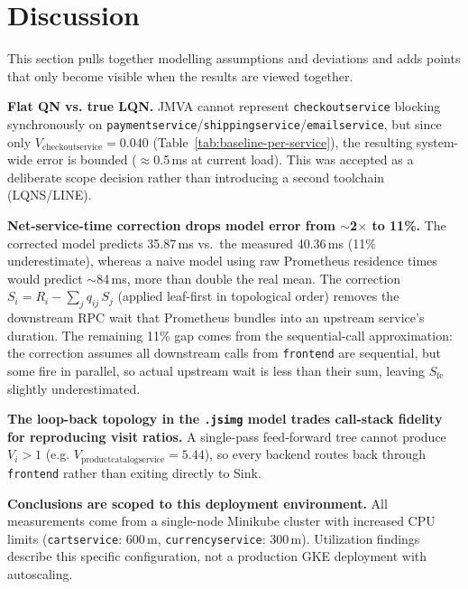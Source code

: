 \documentclass[12pt]{article}
\begin{document}
\section{Discussion}

This section pulls together modelling assumptions and deviations and adds points that only become visible when the results are viewed together.

\textbf{Flat QN vs. true LQN.} JMVA cannot represent \texttt{checkoutservice} blocking synchronously on \texttt{paymentservice}/\texttt{shippingservice}/\texttt{emailservice}, but since only $V_{\text{checkoutservice}}=0.040$ (Table~\ref{tab:baseline-per-service}), the resulting system-wide error is bounded ($\approx$0.5\,ms at current load). This was accepted as a deliberate scope decision rather than introducing a second toolchain (LQNS/LINE).

\textbf{Net-service-time correction drops model error from $\sim$2$\times$ to 11\%.} The corrected model predicts 35.87\,ms vs.\ the measured 40.36\,ms (11\% underestimate), whereas a naive model using raw Prometheus residence times would predict $\sim$84\,ms, more than double the real mean. The correction $S_i = R_i - \sum_j q_{ij}\,S_j$ (applied leaf-first in topological order) removes the downstream RPC wait that Prometheus bundles into an upstream service's duration. The remaining 11\% gap comes from the sequential-call approximation: the correction assumes all downstream calls from \texttt{frontend} are sequential, but some fire in parallel, so actual upstream wait is less than their sum, leaving $S_{\text{fe}}$ slightly underestimated.

\textbf{The loop-back topology in the \texttt{.jsimg} model trades call-stack fidelity for reproducing visit ratios.} A single-pass feed-forward tree cannot produce $V_i>1$ (e.g. $V_{\text{productcatalogservice}}=5.44$), so every backend routes back through \texttt{frontend} rather than exiting directly to Sink.

\textbf{Conclusions are scoped to this deployment environment.} All measurements come from a single-node Minikube cluster with increased CPU limits (\texttt{cartservice}: 600\,m, \texttt{currencyservice}: 300\,m). Utilization findings describe this specific configuration, not a production GKE deployment with autoscaling.
\end{document}
